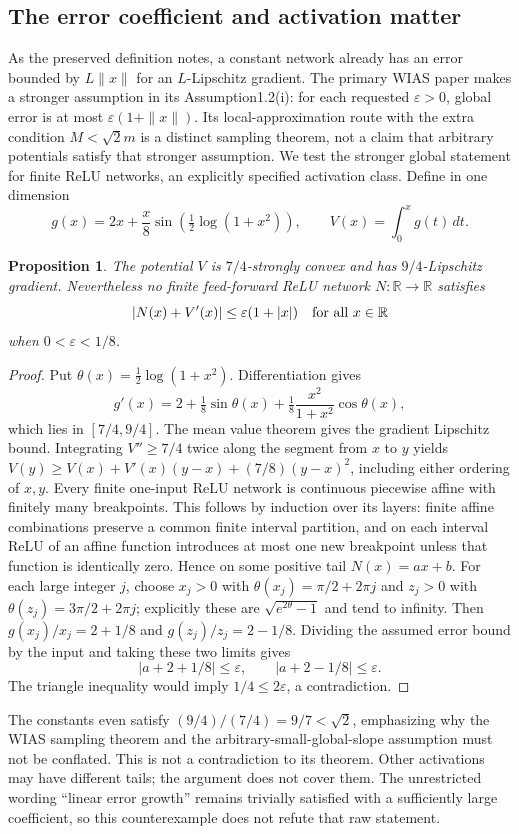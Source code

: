 \documentclass[11pt]{article}
\newtheorem{proposition}{Proposition}
\begin{document}
\subsection{The error coefficient and activation matter}
As the preserved definition notes, a constant network already has an error bounded by $L\|x\|$ for an $L$-Lipschitz gradient. The primary WIAS paper makes a stronger assumption in its Assumption1.2(i): for each requested $\varepsilon>0$, global error is at most $\varepsilon(1+\|x\|)$. Its local-approximation route with the extra condition $M<\sqrt2m$ is a distinct sampling theorem, not a claim that arbitrary potentials satisfy that stronger assumption. We test the stronger global statement for finite ReLU networks, an explicitly specified activation class.
Define in one dimension
\[
g(x)=2x+\frac{x}{8}\sin\!\left(\tfrac12\log(1+x^2)\right),
\qquad V(x)=\int_0^xg(t)\,dt.
\]
\begin{proposition}
The potential $V$ is $7/4$-strongly convex and has $9/4$-Lipschitz gradient. Nevertheless no finite feed-forward ReLU network $N:\mathbb R\to\mathbb R$ satisfies
\[
|N(x)+V'(x)|\le\varepsilon(1+|x|)\quad\hbox{for all }x\in\mathbb R
\]
when $0<\varepsilon<1/8$.
\end{proposition}
\begin{proof}
Put $\theta(x)=\tfrac12\log(1+x^2)$. Differentiation gives
\[
g'(x)=2+\tfrac18\sin\theta(x)+\tfrac18\frac{x^2}{1+x^2}\cos\theta(x),
\]
which lies in $[7/4,9/4]$. The mean value theorem gives the gradient Lipschitz bound. Integrating $V''\ge7/4$ twice along the segment from $x$ to $y$ yields $V(y)\ge V(x)+V'(x)(y-x)+(7/8)(y-x)^2$, including either ordering of $x,y$.
Every finite one-input ReLU network is continuous piecewise affine with finitely many breakpoints. This follows by induction over its layers: finite affine combinations preserve a common finite interval partition, and on each interval ReLU of an affine function introduces at most one new breakpoint unless that function is identically zero. Hence on some positive tail $N(x)=ax+b$.
For each large integer $j$, choose $x_j>0$ with $\theta(x_j)=\pi/2+2\pi j$ and $z_j>0$ with $\theta(z_j)=3\pi/2+2\pi j$; explicitly these are $\sqrt{e^{2\theta}-1}$ and tend to infinity. Then $g(x_j)/x_j=2+1/8$ and $g(z_j)/z_j=2-1/8$. Dividing the assumed error bound by the input and taking these two limits gives
\[
|a+2+1/8|\le\varepsilon,\qquad |a+2-1/8|\le\varepsilon.
\]
The triangle inequality would imply $1/4\le2\varepsilon$, a contradiction.
\end{proof}
The constants even satisfy $(9/4)/(7/4)=9/7<\sqrt2$, emphasizing why the WIAS sampling theorem and the arbitrary-small-global-slope assumption must not be conflated. This is not a contradiction to its theorem. Other activations may have different tails; the argument does not cover them. The unrestricted wording ``linear error growth'' remains trivially satisfied with a sufficiently large coefficient, so this counterexample does not refute that raw statement.
\end{document}
